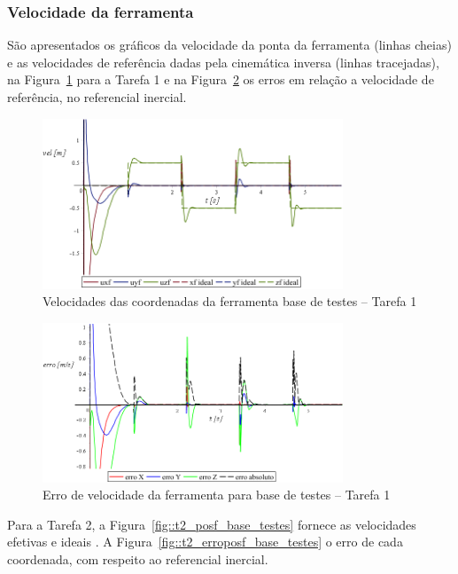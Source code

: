 \subsubsection{Velocidade da ferramenta}

São apresentados os gráficos da velocidade da ponta da ferramenta (linhas
cheias) e as velocidades de referência dadas pela cinemática inversa (linhas
tracejadas), na Figura~\ref{fig::t1_velf_base_testes} para a Tarefa 1 e na
Figura~\ref{fig::t1_errovelf_base_testes} os erros em relação a velocidade de
referência, no referencial inercial.

\begin{figure}[h!]
	\centering 
 	\includegraphics[width=0.80\textwidth]{figs/t1_velf_base_testes}
 	\caption{Velocidades das coordenadas da ferramenta base de testes --
 	Tarefa 1}
 	\label{fig::t1_velf_base_testes}
\end{figure}

\begin{figure}[h!]
	\centering 
 	\includegraphics[width=0.80\textwidth]{figs/t1_errovelf_base_testes}
 	\caption{Erro de velocidade da ferramenta para base de testes --
 	Tarefa 1}
 	\label{fig::t1_errovelf_base_testes}
\end{figure}

Para a Tarefa 2, a Figura~\ref{fig::t2_posf_base_testes} fornece as velocidades
efetivas e ideais . A Figura~\ref{fig::t2_erroposf_base_testes} o erro de cada
coordenada, com respeito ao referencial inercial.

